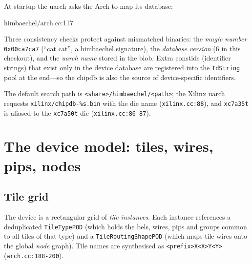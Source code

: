 \documentclass[11pt,a4paper]{article}
\begin{document}
At startup the uarch asks the Arch to map its database:

\begin{cppfile}{himbaechel/arch.cc:117}
  
\end{cppfile}

Three consistency checks protect against mismatched binaries: the
\emph{magic number} \texttt{0x00ca7ca7} (``cat cat'', a himbaechel
signature), the \emph{database version} (6 in this checkout), and the
\emph{uarch name} stored in the blob. Extra constids (identifier
strings) that exist only in the device database are registered into
the \texttt{IdString} pool at the end---so the chipdb is also the
source of device-specific identifiers.

The default search path is \texttt{<share>/himbaechel/<path>}; the
Xilinx uarch requests \texttt{xilinx/chipdb-\%s.bin} with the die name
(\texttt{xilinx.cc:88}), and \texttt{xc7a35t} is aliased to the
\texttt{xc7a50t} die (\texttt{xilinx.cc:86-87}).

\section{The device model: tiles, wires, pips, nodes}
\label{sec:model}

\subsection{Tile grid}

The device is a rectangular grid of \emph{tile instances}. Each
instance references a deduplicated \texttt{TileTypePOD} (which holds
the bels, wires, pips and groups common to all tiles of that type) and
a \texttt{TileRoutingShape\-POD} (which maps tile wires onto the global
\emph{node} graph). Tile names are synthesised as
\texttt{<prefix>X<X>Y\allowbreak<Y>}\allowbreak{} (\texttt{arch.cc:188-200}).
\end{document}
